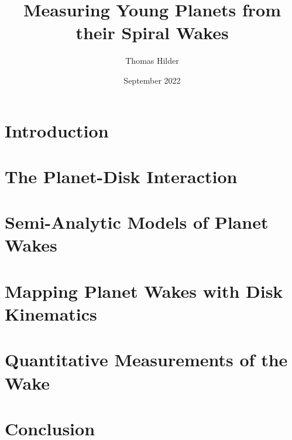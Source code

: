 \documentclass[11pt,a4paper,onecolumn]{report}
\title{Measuring Young Planets from their Spiral Wakes}
\author{Thomas Hilder}
\date{September 2022}
\begin{document}
    
    

    

    

    

    \tableofcontents
    \clearpage


    \chapter{Introduction}
    

    \chapter{The Planet-Disk Interaction}
    

    \chapter{Semi-Analytic Models of Planet Wakes}
    

    \chapter{Mapping Planet Wakes with Disk Kinematics}
    

    \chapter{Quantitative Measurements of the Wake}
    

    \chapter{Conclusion}
    

    
    
\end{document}
